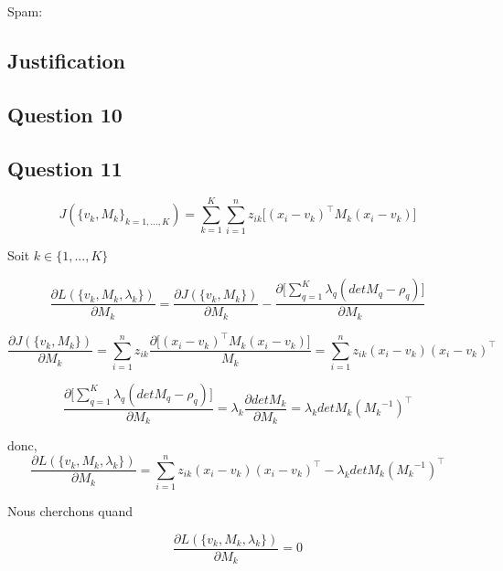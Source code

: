 \documentclass[a4paper,11pt,oneside,roman]{article}
\begin{document}
    Spam:

    \subsection{Justification}
    \subsection*{Question 10}
    \subsection*{Question 11}

    \begin{equation}
        J(\{v_k, M_k\}_{k=1,...,K}) = \sum^{K}_{k=1}\sum^{n}_{i=1} z_{ik} \big[ (x_i-v_k)^\top M_k (x_i-v_k)\big]
    \end{equation}

    Soit $k\in \{1,...,K\}$

    \begin{equation}
        \frac{\partial L(\{v_k, M_k, \lambda_k\})}{\partial M_k} = \frac{\partial J(\{v_k, M_k\})}{\partial M_k} - \frac{\partial\big[ \sum^{K}_{q=1} \lambda_q (det M_q - \rho_q)\big]}{\partial M_k}
    \end{equation}

    \begin{equation}
        \frac{\partial J(\{v_k, M_k\})}{\partial M_k} = \sum^{n}_{i=1} z_{ik} \frac{\partial \big[(x_i-v_k)^\top M_k (x_i-v_k)\big]}{M_k} =  \sum^{n}_{i=1} z_{ik} (x_i-v_k)(x_i-v_k)^\top
    \end{equation}
    
    \begin{equation}
        \frac{\partial \big[\sum^{K}_{q=1} \lambda_q (det M_q - \rho_q)\big]}{\partial M_k} = \lambda_k \frac{\partial det M_k}{\partial M_k} = \lambda_k det M_k ({M_k}^{-1})^\top
    \end{equation}

    donc,
    \begin{equation}
        \frac{\partial L(\{v_k, M_k, \lambda_k\})}{\partial M_k} = \sum^{n}_{i=1} z_{ik} (x_i-v_k)(x_i-v_k)^\top - \lambda_k det M_k ({M_k}^{-1})^\top
    \end{equation}

    Nous cherchons quand 

    \begin{equation}
        \frac{\partial L(\{v_k, M_k, \lambda_k\})}{\partial M_k} = 0
    \end{equation}
\end{document}
